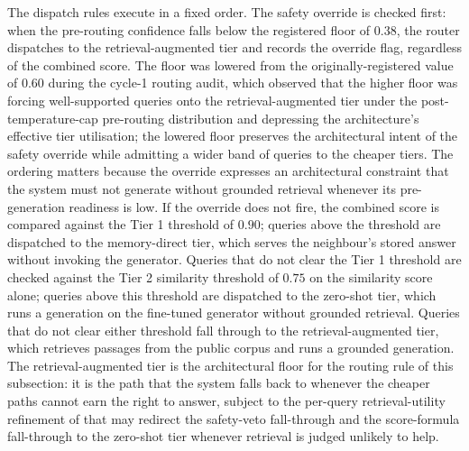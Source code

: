 The dispatch rules execute in a fixed order. The safety override is checked first: when the pre-routing confidence falls below the registered floor of $0.38$, the router dispatches to the retrieval-augmented tier and records the override flag, regardless of the combined score. The floor was lowered from the originally-registered value of $0.60$ during the cycle-1 routing audit, which observed that the higher floor was forcing well-supported queries onto the retrieval-augmented tier under the post-temperature-cap pre-routing distribution and depressing the architecture's effective tier utilisation; the lowered floor preserves the architectural intent of the safety override while admitting a wider band of queries to the cheaper tiers. The ordering matters because the override expresses an architectural constraint that the system must not generate without grounded retrieval whenever its pre-generation readiness is low. If the override does not fire, the combined score is compared against the Tier 1 threshold of $0.90$; queries above the threshold are dispatched to the memory-direct tier, which serves the neighbour's stored answer without invoking the generator. Queries that do not clear the Tier 1 threshold are checked against the Tier 2 similarity threshold of $0.75$ on the similarity score alone; queries above this threshold are dispatched to the zero-shot tier, which runs a generation on the fine-tuned generator without grounded retrieval. Queries that do not clear either threshold fall through to the retrieval-augmented tier, which retrieves passages from the public corpus and runs a grounded generation. The retrieval-augmented tier is the architectural floor for the routing rule of this subsection: it is the path that the system falls back to whenever the cheaper paths cannot earn the right to answer, subject to the per-query retrieval-utility refinement of  that may redirect the safety-veto fall-through and the score-formula fall-through to the zero-shot tier whenever retrieval is judged unlikely to help.

